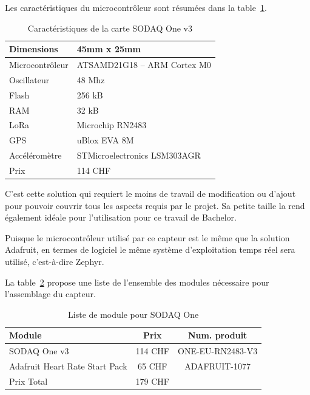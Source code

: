 Les caractéristiques du microcontrôleur sont résumées dans la table~\ref{tab:sodaq_one_cara}.

\begin{table}[htb]
\caption[SODAQ One Caractéristiques]{Caractéristiques de la carte SODAQ One v3}
\label{tab:sodaq_one_cara}
\centering
\begin{tabular}{ l | l }
\toprule
Dimensions & 45mm x 25mm \\
\midrule
Microcontrôleur & ATSAMD21G18 – ARM Cortex M0 \\
\midrule
Oscillateur & 48 Mhz \\
\midrule
Flash & 256 kB \\
\midrule
RAM & 32 kB \\
\midrule
LoRa & Microchip RN2483 \\
\midrule
GPS & uBlox EVA 8M \\
\midrule
Accéléromètre & STMicroelectronics LSM303AGR \\
\midrule
Prix & 114 CHF\\
\bottomrule 
\end{tabular}
\end{table}

C’est cette solution qui requiert le moins de travail de modification ou d’ajout pour pouvoir couvrir tous les aspects requis par le projet. Sa petite taille la rend également idéale pour l’utilisation pour ce travail de Bachelor.

Puisque le microcontrôleur utilisé par ce capteur est le même que la solution Adafruit, en termes de logiciel le même système d’exploitation temps réel sera utilisé, c’est-à-dire Zephyr.

La table~\ref{tab:sodaq_one_liste} propose une liste de l'ensemble des modules nécessaire pour l'assemblage du capteur.

\begin{table}[htb]
\caption[SODAQ One List]{Liste de module pour SODAQ One}
\label{tab:sodaq_one_liste}
\centering
\begin{tabular}{lcc}
\toprule
Module & Prix & Num. produit \\ 
\midrule
SODAQ One v3 & 114 CHF & ONE-EU-RN2483-V3 \\
Adafruit Heart Rate Start Pack & 65 CHF & ADAFRUIT-1077 \\
\midrule
Prix Total & 179 CHF &  \\
\bottomrule 
\end{tabular}
\end{table}

